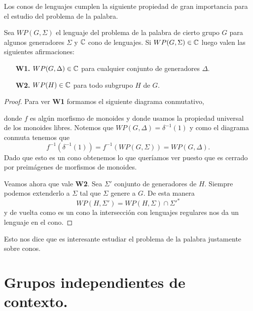 \documentclass[tesis.tex]{subfiles}
\begin{document}
Los conos de lenguajes cumplen la siguiente propiedad de gran importancia para el estudio del problema de la palabra.
\medskip
\begin{prop}\label{prop-cono-wp}
	Sea $WP(G, \Sigma)$ el lenguaje del problema de la palabra de cierto grupo $G$ para algunos generadores $\Sigma$ y $\mathbb{C}$ cono de lenguajes. 
	Si $WP(G, \Sigma) \in \mathbb{C}$ luego valen las siguientes afirmaciones:
	\begin{itemize}
		\item[\textbf{W1.}] $WP(G, \Delta) \in \mathbb{C}$ para cualquier conjunto de generadores $\Delta$.
		\item[\textbf{W2.}] $WP(H) \in \mathbb{C}$ para todo subgrupo $H$ \fg de $G$.
	\end{itemize} 
\end{prop}
\begin{proof}
		Para ver \textbf{W1} formamos el siguiente diagrama conmutativo,
		\begin{center}
		\end{center}
		donde $f$ es algún morfismo de monoides y donde usamos la propiedad universal de los monoides libres.
		Notemos que $WP(G, \Delta) = \delta^{-1}(1)$ y como el diagrama conmuta tenemos que 
		\[
		f^{-1}(\delta^{-1}(1)) = f^{-1}(WP(G,\Sigma)) = WP(G, \Delta).
		\]
		Dado que esto es un cono obtenemos lo que queríamos ver puesto que es cerrado por preimágenes de morfismos de monoides.
		
		
		
		Veamos ahora que vale \textbf{W2}. 
		Sea $\Sigma'$ conjunto de generadores de $H$.
		Siempre podemos extenderlo a $\Sigma$ tal que $\Sigma$ genere a $G$. 
		De esta manera 
		\[
		WP(H, \Sigma') = WP(H, \Sigma) \cap \Sigma'^*
		\]
		y de vuelta como es un cono la intersección con lenguajes regulares nos da un lenguaje en el cono. 

\end{proof}


Esto nos dice que es interesante estudiar el problema de la palabra justamente sobre conos.

\section{Grupos independientes de contexto.}
\end{document}
